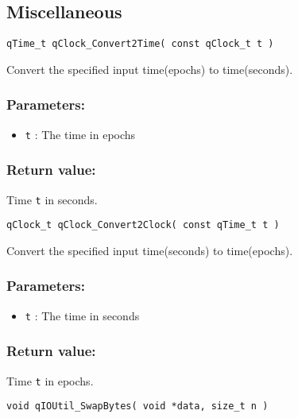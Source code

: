 \subsection{Miscellaneous}

\begin{lstlisting}[style=CStyle]
qTime_t qClock_Convert2Time( const qClock_t t )
\end{lstlisting}

Convert the specified input time(epochs) to time(seconds). 

\subsubsection*{Parameters:}
\begin{itemize}
    \item \lstinline{t} : The time in epochs
\end{itemize}

\subsubsection*{Return value:}
Time \lstinline{t} in seconds.
 
\noindent\hrulefill

\begin{lstlisting}[style=CStyle]
qClock_t qClock_Convert2Clock( const qTime_t t )
\end{lstlisting}

Convert the specified input time(seconds) to time(epochs). 

\subsubsection*{Parameters:}
\begin{itemize}
    \item \lstinline{t} : The time in seconds
\end{itemize}

\subsubsection*{Return value:}
 Time \lstinline{t} in epochs.

\noindent\hrulefill

\begin{lstlisting}[style=CStyle]
void qIOUtil_SwapBytes( void *data, size_t n )
\end{lstlisting}

